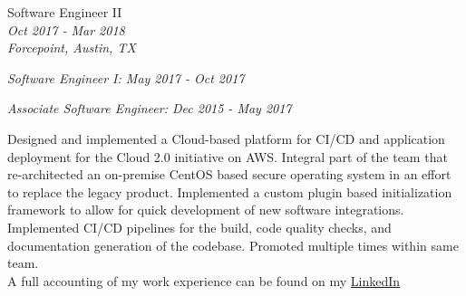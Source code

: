 \documentclass[10pt]{article} %
\begin{document}
\begin{minipage}[t]{0.5\textwidth}
{
\raggedright\large  Software Engineer II\\
\small \textit{Oct 2017 - Mar 2018}\\
\small \textit{Forcepoint, Austin, TX}\\
\raggedright\small \textit{Software Engineer I: May 2017 - Oct 2017}\\
\raggedright\small \textit{Associate Software Engineer: Dec 2015 - May 2017}\\
[5pt]
}

\normalsize{Designed and implemented a Cloud-based platform for CI/CD and application deployment for the Cloud 2.0 initiative on AWS. Integral part of the team that re-architected an on-premise CentOS based secure operating system in an effort to replace the legacy product. Implemented a custom plugin based initialization framework to allow for quick development of new software integrations. Implemented CI/CD pipelines for the build, code quality checks, and documentation generation of the codebase. Promoted multiple times within same team.}\\


A full accounting of my work experience can be found on my \href{https://www.linkedin.com/in/mason-egger/}{LinkedIn}\\ 

\end{minipage}
\hfill
\end{document}
